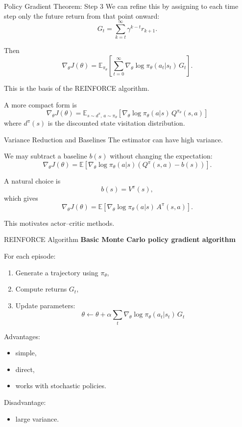 \documentclass{beamer}
\begin{document}
\begin{frame}{Policy Gradient Theorem: Step 3}
  We can refine this by assigning to each time step only the future return from that point onward:
  \[
  G_t=\sum_{k=t}^\infty \gamma^{k-t}r_{k+1}.
  \]

  Then
  \[
  \nabla_\theta J(\theta)=
  \mathbb{E}_{\pi_\theta}
  \left[
    \sum_{t=0}^\infty \nabla_\theta \log \pi_\theta(a_t|s_t)\,G_t
    \right].
  \]

  This is the basis of the REINFORCE algorithm.

  A more compact form is
  \[
  \nabla_\theta J(\theta)=
  \mathbb{E}_{s\sim d^\pi,\,a\sim \pi_\theta}
  \left[
    \nabla_\theta \log \pi_\theta(a|s)\,Q^{\pi_\theta}(s,a)
    \right]
  \]
  where $d^\pi(s)$ is the discounted state visitation distribution.
\end{frame}

\begin{frame}{Variance Reduction and Baselines}
  The estimator can have high variance.

  We may subtract a baseline $b(s)$ without changing the expectation:
  \[
  \nabla_\theta J(\theta)=
  \mathbb{E}\left[
    \nabla_\theta \log \pi_\theta(a|s)\left(Q^\pi(s,a)-b(s)\right)
    \right].
  \]

  A natural choice is
  \[
  b(s)=V^\pi(s),
  \]
  which gives
  \[
  \nabla_\theta J(\theta)=
  \mathbb{E}\left[
    \nabla_\theta \log \pi_\theta(a|s)\,A^\pi(s,a)
    \right].
  \]

  This motivates actor--critic methods.
\end{frame}

\begin{frame}{REINFORCE Algorithm}
  \textbf{Basic Monte Carlo policy gradient algorithm}

  For each episode:
  \begin{enumerate}
  \item Generate a trajectory using $\pi_\theta$,
  \item Compute returns $G_t$,
  \item Update parameters:
    \[
    \theta \leftarrow \theta + \alpha
    \sum_t \nabla_\theta \log \pi_\theta(a_t|s_t)\,G_t
    \]
  \end{enumerate}

  Advantages:
  \begin{itemize}
  \item simple,
  \item direct,
  \item works with stochastic policies.
  \end{itemize}

  Disadvantage:
  \begin{itemize}
  \item large variance.
  \end{itemize}
\end{frame}
\end{document}
